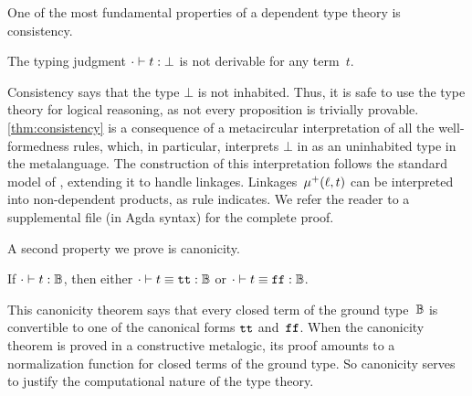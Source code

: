 One of the most fundamental properties of a dependent type theory is consistency.
\begin{theorem}[Consistency]
\label{thm:consistency}
  The typing judgment $ {\cdot} \vdash {t} : {\bot} $ is not derivable for any term~$t$.
\end{theorem}

\noindent
Consistency says that the type $\bot$ is not inhabited.
Thus, it is safe to use the type theory for logical reasoning, as not
every proposition is trivially provable.
\cref{thm:consistency} is a consequence of a meta\-circular interpretation of all
the well-formedness rules, which, in particular, interprets $\bot$ in
\TT as an uninhabited type in the meta\-language.
The construction of this interpretation follows the standard model of
\citet{altkap2016}, extending it to handle linkages.
Linkages~$\mu^+({\ell},{t})$ can be interpreted into non-dependent products,
as rule  indicates.
%
We refer the reader to a supplemental file (in Agda syntax) for the complete proof.


A second property we prove is canonicity.

\begin{theorem}[Canonicity]
\label{thm:canonicity}
  If $ {\cdot} \vdash {t} : {\mathbb{B}} $, then either $ {\cdot} \vdash {t \equiv \ensuremath{\texttt{tt}}} : {\mathbb{B}} $ or $ {\cdot} \vdash {t \equiv \ensuremath{\texttt{ff}}} : {\mathbb{B}} $.
\end{theorem}

\noindent
This canonicity theorem says that every closed term of the ground
type~$\mathbb{B}$ is convertible to one of the canonical forms $\texttt{tt}$ and~$\texttt{ff}$.
When the canonicity theorem is proved in a constructive meta\-logic, its proof
amounts to a normalization function for closed terms of the ground type.
So canonicity serves to justify the computational nature of the type theory.

